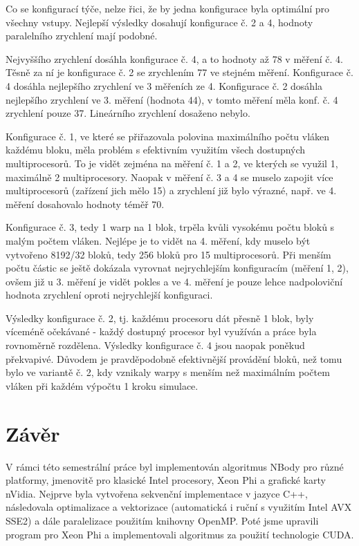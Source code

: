 \documentclass[12pt]{article}
\begin{document}
Co se konfigurací týče, nelze řici, že by jedna konfigurace byla optimální pro všechny vstupy.
Nejlepší výsledky dosahují konfigurace č. 2 a 4, hodnoty paralelního zrychlení mají podobné.

Nejvyššího zrychlení dosáhla konfigurace č. 4, a to hodnoty až 78 v měření č. 4. Těsně za ní je konfigurace č. 2 se zrychlením 77 ve stejném měření.
Konfigurace č. 4 dosáhla nejlepšího zrychlení ve 3 měřeních ze 4.
Konfigurace č. 2 dosáhla nejlepšího zrychlení ve 3. měření (hodnota 44), v tomto měření měla konf. č. 4 zrychlení pouze 37.
Lineárního zrychlení dosaženo nebylo.

Konfigurace č. 1, ve které se přiřazovala polovina maximálního počtu vláken každému bloku,
měla problém s efektivním využitím všech dostupných multiprocesorů.
To je vidět zejména na měření č. 1 a 2, ve kterých se využil 1, maximálně 2 multiprocesory.
Naopak v měření č. 3 a 4 se muselo zapojit více multiprocesorů (zařízení jich mělo 15) a zrychlení již bylo výrazné, např. ve 4. měření dosahovalo hodnoty téměř 70.

Konfigurace č. 3, tedy 1 warp na 1 blok, trpěla kvůli vysokému počtu bloků s malým počtem vláken.
Nejlépe je to vidět na 4. měření, kdy muselo být vytvořeno 8192/32 bloků, tedy 256 bloků pro 15 multiprocesorů.
Při menším počtu částic se ještě dokázala vyrovnat nejrychlejším konfiguracím (měření 1, 2),
ovšem již u 3. měření je vidět pokles a ve 4. měření je pouze lehce nadpoloviční hodnota zrychlení oproti nejrychlejší konfiguraci.

Výsledky konfigurace č. 2, tj. každému procesoru dát přesně 1 blok, byly víceméně očekávané - každý dostupný procesor byl využíván a práce byla rovnoměrně rozdělena.
Výsledky konfigurace č. 4 jsou naopak poněkud překvapivé.
Důvodem je pravděpodobně efektivnější provádění bloků, než tomu bylo ve variantě č. 2,
kdy vznikaly warpy s menším než maximálním počtem vláken při každém výpočtu 1 kroku simulace.

\newpage
\section{Závěr}
V rámci této semestrální práce byl implementován algoritmus NBody pro různé platformy, jmenovitě pro klasické Intel procesory, Xeon Phi a grafické karty nVidia.
Nejprve byla vytvořena sekvenční implementace v jazyce C++,
následovala optimalizace a vektorizace (auto\-matická i ruční s využitím Intel AVX SSE2)
a dále paralelizace použitím knihovny OpenMP.
Poté jsme upravili program pro Xeon Phi a implemen\-tovali algoritmus za použití technologie CUDA.
\end{document}
